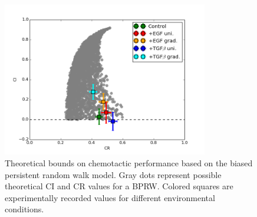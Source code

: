 \begin{figure}
    \centering
    \includegraphics[width=0.80\textwidth]{../fig/ch2_fig4.png}
    \caption{Theoretical bounds on chemotactic performance based on the biased persistent random walk model. Gray dots represent possible theoretical CI and CR values for a BPRW. Colored squares are experimentally recorded values for different environmental conditions.} \label{fig:ch2_4}
\end{figure}

